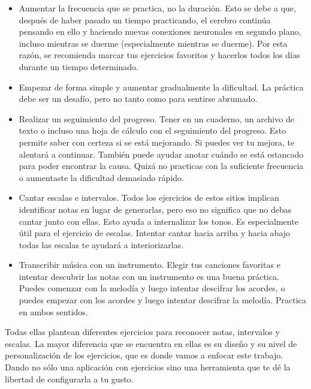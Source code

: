 \documentclass[12pt,twoside,titlepage]{report}
\begin{document}
\begin{itemize}
    \item Aumentar la frecuencia que se practica, no la duración. Esto se debe a que, después de haber pasado un tiempo practicando, el cerebro continúa pensando en ello y haciendo nuevas conexiones neuronales en segundo plano, incluso mientras se duerme (especialmente mientras se duerme). Por esta razón, se recomienda marcar tus ejercicios favoritos y hacerlos todos los días durante un tiempo determinado.
    
    \item Empezar de forma simple y aumentar gradualmente la dificultad. La práctica debe ser un desafío, pero no tanto como para sentirse abrumado.
    
    \item Realizar un seguimiento del progreso. Tener en un cuaderno, un archivo de texto o incluso una hoja de cálculo con el seguimiento del progreso. Esto permite saber con certeza si se está mejorando. Si puedes ver tu mejora, te alentará a continuar. También puede ayudar anotar cuándo se está estancado para poder encontrar la causa. Quizá no practicas con la suficiente frecuencia o aumentaste la dificultad demasiado rápido.
    
    \item Cantar escalas e intervalos. Todos los ejercicios de estos sitios implican identificar notas en lugar de generarlas, pero eso no significa que no debas cantar junto con ellas. Esto ayuda a internalizar los tonos. Es especialmente útil para el ejercicio de escalas. Intentar cantar hacia arriba y hacia abajo todas las escalas te ayudará a interiorizarlas.
    
    \item Transcribir música con un instrumento. Elegir tus canciones favoritas e intentar descubrir las notas con un instrumento es una buena práctica. Puedes comenzar con la melodía y luego intentar descifrar los acordes, o puedes empezar con los acordes y luego intentar descifrar la melodía. Practica en ambos sentidos.
\end{itemize}

Todas ellas plantean diferentes ejercicios para reconocer notas, intervalos y escalas. La mayor diferencia que se encuentra en ellas es su diseño y su nivel de personalización de los ejercicios, que es donde vamos a enfocar este trabajo. Dando no sólo una aplicación con ejercicios sino una herramienta que te dé la libertad de configurarla a tu gusto.
\end{document}
